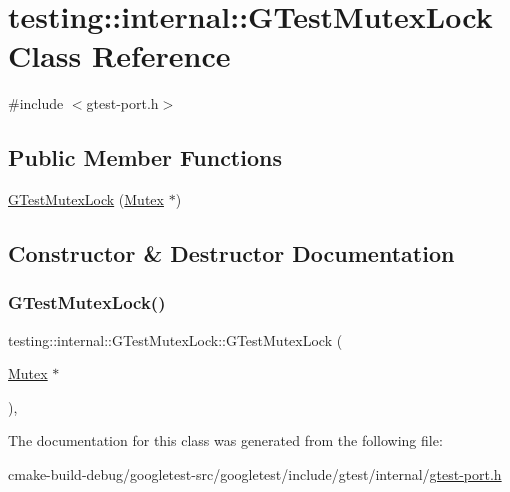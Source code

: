 \hypertarget{classtesting_1_1internal_1_1GTestMutexLock}{}\section{testing\+::internal\+::G\+Test\+Mutex\+Lock Class Reference}
\label{classtesting_1_1internal_1_1GTestMutexLock}


{\ttfamily \#include $<$gtest-\/port.\+h$>$}

\subsection*{Public Member Functions}
\begin{DoxyCompactItemize}
\item 
\mbox{\hyperlink{classtesting_1_1internal_1_1GTestMutexLock_a77e3cba326d5356b4a1dea3790559c26}{G\+Test\+Mutex\+Lock}} (\mbox{\hyperlink{classtesting_1_1internal_1_1Mutex}{Mutex}} $\ast$)
\end{DoxyCompactItemize}


\subsection{Constructor \& Destructor Documentation}
\mbox{\label{classtesting_1_1internal_1_1GTestMutexLock_a77e3cba326d5356b4a1dea3790559c26}} 
\subsubsection{\texorpdfstring{GTestMutexLock()}{GTestMutexLock()}}
{\footnotesize\ttfamily testing\+::internal\+::\+G\+Test\+Mutex\+Lock\+::\+G\+Test\+Mutex\+Lock (\begin{DoxyParamCaption}\item[{\mbox{\hyperlink{classtesting_1_1internal_1_1Mutex}{Mutex}} $\ast$}]{ }\end{DoxyParamCaption})\hspace{0.3cm}{\ttfamily [inline]}, {\ttfamily [explicit]}}



The documentation for this class was generated from the following file\+:\begin{DoxyCompactItemize}
\item 
cmake-\/build-\/debug/googletest-\/src/googletest/include/gtest/internal/\mbox{\hyperlink{gtest-port_8h}{gtest-\/port.\+h}}\end{DoxyCompactItemize}
